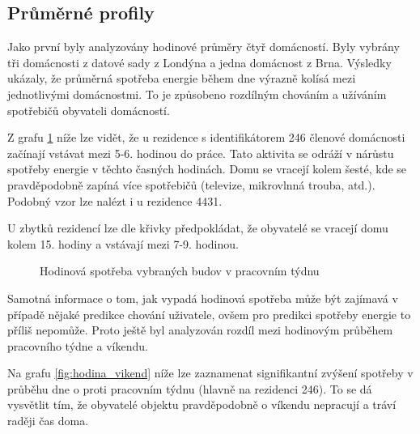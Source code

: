 \documentclass[FM,BP,fonts]{tulthesis}
\begin{document}
\newpage

\subsection{Průměrné profily}
Jako první byly analyzovány hodinové průměry čtyř domácností. Byly vybrány tři domácnosti z datové sady z Londýna a jedna domácnost z Brna. Výsledky ukázaly, že průměrná spotřeba energie během dne výrazně kolísá mezi jednotlivými domácnostmi. To je způsobeno rozdílným chováním a užíváním spotřebičů obyvateli domácností.

Z grafu \ref{fig:hodina_pracovni} níže lze vidět, že u rezidence s identifikátorem 246 členové domácnosti začínají vstávat mezi 5-6. hodinou do práce. Tato aktivita se odráží v nárůstu spotřeby energie v těchto časných hodinách. Domu se vracejí kolem šesté, kde se pravděpodobně zapíná více spotřebičů (televize, mikrovlnná trouba, atd.). Podobný vzor lze nalézt i u rezidence 4431.

U zbytků rezidencí lze dle křivky předpokládat, že obyvatelé se vracejí domu kolem 15. hodiny a vstávají mezi 7-9. hodinou.
 
\begin{figure}[htbp]
	\centering
	\caption{Hodinová spotřeba vybraných budov v pracovním týdnu}
	\label{fig:hodina_pracovni}
\end{figure}

Samotná informace o tom, jak vypadá hodinová spotřeba může být zajímavá v případě nějaké predikce chování uživatele, ovšem pro predikci spotřeby energie to příliš nepomůže. Proto ještě byl analyzován rozdíl mezi hodinovým průběhem pracovního týdne a víkendu.

Na grafu \ref{fig:hodina_vikend} níže lze zaznamenat signifikantní zvýšení spotřeby v průběhu dne o proti pracovním týdnu (hlavně na rezidenci 246). To se dá vysvětlit tím, že obyvatelé objektu pravděpodobně o víkendu nepracují a tráví raději čas doma.
\end{document}
